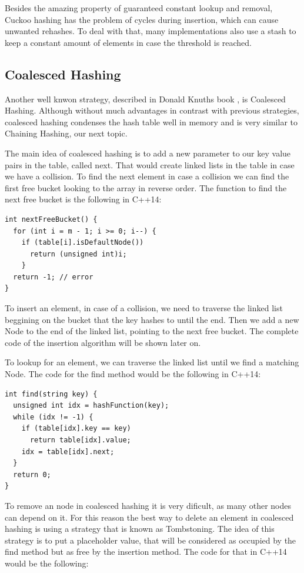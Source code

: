 Besides the amazing property of guaranteed constant lookup and removal, Cuckoo hashing has the problem of cycles during insertion, which can cause unwanted rehashes. To deal with that, many implementations also use a stash to keep a constant amount of elements in case the threshold is reached.

\subsection{Coalesced Hashing}

Another well knwon strategy, described in Donald Knuths book \citep{TAOCP3}, is Coalesced Hashing. Although without much advantages in contrast with previous strategies, coalesced hashing condenses the hash table well in memory and is very similar to Chaining Hashing, our next topic.

The main idea of coalesced hashing is to add a new parameter to our key value pairs in the table, called next. That would create linked lists in the table in case we have a collision. To find the next element in case a collision we can find the first free bucket looking to the array in reverse order. The function to find the next free bucket is the following in C++14:

\begin{lstlisting}
int nextFreeBucket() {
  for (int i = m - 1; i >= 0; i--) {
    if (table[i].isDefaultNode())
      return (unsigned int)i;
    }
  return -1; // error
}
\end{lstlisting}

To insert an element, in case of a collision, we need to traverse the linked list beggining on the bucket that the key hashes to until the end. Then we add a new Node to the end of the linked list, pointing to the next free bucket. The complete code of the insertion algorithm will be shown later on.

To lookup for an element, we can traverse the linked list until we find a matching Node. The code for the find method would be the following in C++14:

\begin{lstlisting}
int find(string key) {
  unsigned int idx = hashFunction(key);
  while (idx != -1) {
    if (table[idx].key == key) 
      return table[idx].value;
    idx = table[idx].next;         
  }    
  return 0;
}
\end{lstlisting}

To remove an node in coalesced hashing it is very dificult, as many other nodes can depend on it. For this reason the best way to delete an element in coalesced hashing is using a strategy that is known as Tombstoning. The idea of this strategy is to put a placeholder value, that will be considered as occupied by the find method but as free by the insertion method. The code for that in C++14 would be the following:

